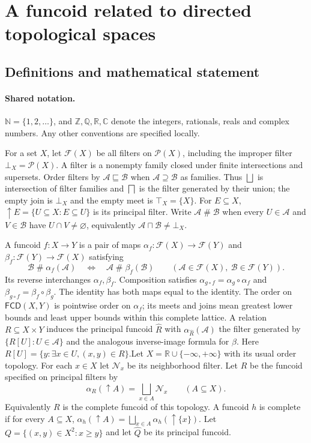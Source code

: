 \documentclass[11pt]{article}
\begin{document}
\section{A funcoid related to directed topological spaces}\label{statement}

\subsection{Definitions and mathematical statement}

\paragraph{Shared notation.}$\mathbb N=\{1,2,\ldots\}$, and $\mathbb Z,\mathbb Q,\mathbb R,\mathbb C$ denote the integers, rationals, reals and complex numbers. Any other conventions are specified locally.


For a set $X$, let $\mathcal F(X)$ be all filters on $\mathcal P(X)$, including the improper filter $\bot_X=\mathcal P(X)$. A filter is a nonempty family closed under finite intersections and supersets. Order filters by $\mathcal A\sqsubseteq\mathcal B$ when $\mathcal A\supseteq\mathcal B$ as families. Thus $\bigsqcup$ is intersection of filter families and $\bigsqcap$ is the filter generated by their union; the empty join is $\bot_X$ and the empty meet is $\top_X=\{X\}$. For $E\subseteq X$, $\uparrow E=\{U\subseteq X:E\subseteq U\}$ is its principal filter. Write $\mathcal A\mathrel{\#}\mathcal B$ when every $U\in\mathcal A$ and $V\in\mathcal B$ have $U\cap V\ne\varnothing$, equivalently $\mathcal A\sqcap\mathcal B\ne\bot_X$.

A funcoid $f:X\to Y$ is a pair of maps $\alpha_f:\mathcal F(X)\to\mathcal F(Y)$ and $\beta_f:\mathcal F(Y)\to\mathcal F(X)$ satisfying
\[
 \mathcal B\mathrel{\#}\alpha_f(\mathcal A)
 \quad\Longleftrightarrow\quad
 \mathcal A\mathrel{\#}\beta_f(\mathcal B)
 \qquad(\mathcal A\in\mathcal F(X),\ \mathcal B\in\mathcal F(Y)).
\]
Its reverse interchanges $\alpha_f,\beta_f$. Composition satisfies $\alpha_{g\circ f}=\alpha_g\circ\alpha_f$ and $\beta_{g\circ f}=\beta_f\circ\beta_g$. The identity has both maps equal to the identity. The order on $\mathsf{FCD}(X,Y)$ is pointwise order on $\alpha_f$; its meets and joins mean greatest lower bounds and least upper bounds within this complete lattice. A relation $R\subseteq X\times Y$ induces the principal funcoid $\widehat R$ with $\alpha_{\widehat R}(\mathcal A)$ the filter generated by $\{R[U]:U\in\mathcal A\}$ and the analogous inverse-image formula for $\beta$. Here $R[U]=\{y:\exists x\in U,(x,y)\in R\}$.Let $X=\mathbb R\cup\{-\infty,+\infty\}$ with its usual order topology. For each $x\in X$ let $\mathcal N_x$ be its neighborhood filter. Let $R$ be the funcoid specified on principal filters by
\[
 \alpha_R(\uparrow A)=\bigsqcup_{x\in A}\mathcal N_x\qquad(A\subseteq X).
\]
Equivalently $R$ is the complete funcoid of this topology. A funcoid $h$ is complete if for every $A\subseteq X$, $\alpha_h(\uparrow A)=\bigsqcup_{x\in A}\alpha_h(\uparrow\{x\})$. Let $Q=\{(x,y)\in X^2:x\ge y\}$ and let $\widehat Q$ be its principal funcoid.
\end{document}
